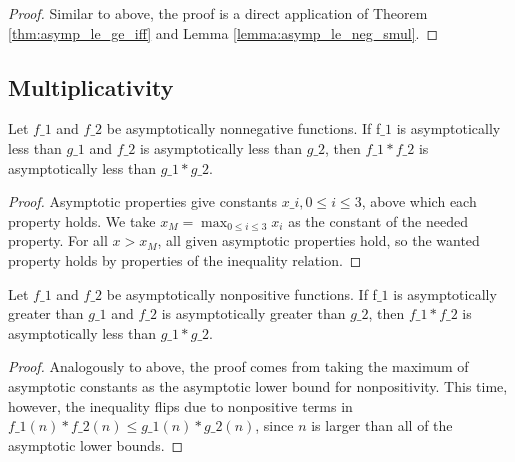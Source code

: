 \begin{proof}
    \leanok
    Similar to above, the proof is a direct application of Theorem \ref{thm:asymp_le_ge_iff}
    and Lemma \ref{lemma:asymp_le_neg_smul}.
\end{proof}


\subsection{Multiplicativity}

\begin{theorem}
    \label{thm:asymp_le_nonneg_mul}
    \leanok
    Let $f\_1$ and $f\_2$ be asymptotically nonnegative functions. If f$\_1$ is asymptotically
    less than $g\_1$ and $f\_2$ is asymptotically less than $g\_2$, then $f\_1 * f\_2$
    is asymptotically less than $g\_1 * g\_2$.
\end{theorem}

\begin{proof}
    \leanok
    Asymptotic properties give constants $x\_i, 0 \le i \le 3$, above which each property holds.
    We take $x_M = \max_{0 \le i \le 3} x_i$ as the constant of the needed property. 
    For all $x > x_M$, all given asymptotic properties hold, so the wanted property holds
    by properties of the inequality relation.
\end{proof}

\begin{theorem}
    \label{thm:asymp_ge_nonpos_mul}
    \leanok
    Let $f\_1$ and $f\_2$ be asymptotically nonpositive functions. If f$\_1$ is asymptotically
    greater than $g\_1$ and $f\_2$ is asymptotically greater than $g\_2$, then $f\_1 * f\_2$
    is asymptotically less than $g\_1 * g\_2$.
\end{theorem}

\begin{proof}
    \leanok
    Analogously to above, the proof comes from taking the maximum of asymptotic constants 
    as the asymptotic lower bound for nonpositivity. This time, however, the inequality
    flips due to nonpositive terms in $f\_1(n) * f\_2(n) \le g\_1(n) * g\_2(n)$, since 
    $n$ is larger than all of the asymptotic lower bounds.
\end{proof}
